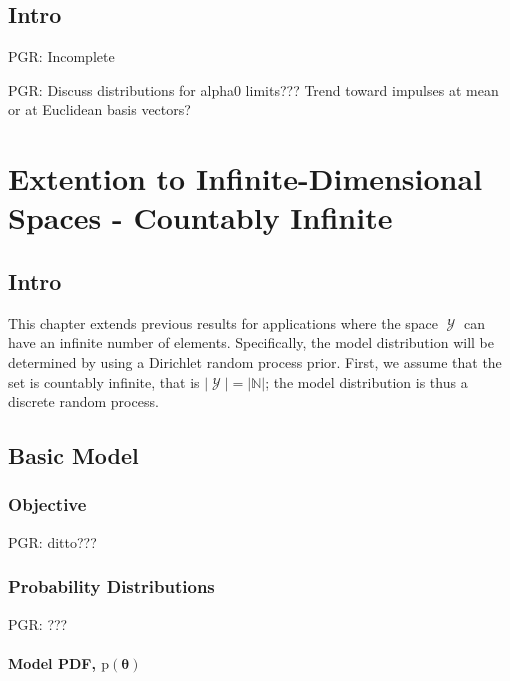 \documentclass[12pt]{report}
\DeclareMathOperator{\Ycal}{\mathcal{Y}}
\begin{document}
\section{Intro}

PGR: Incomplete

PGR: Discuss distributions for alpha0 limits??? Trend toward impulses at mean or at Euclidean basis vectors?















\chapter{Extention to Infinite-Dimensional Spaces - Countably Infinite}


\section{Intro}

This chapter extends previous results for applications where the space $\Ycal$ can have an infinite number of elements. Specifically, the model distribution will be determined by using a Dirichlet random process prior. First, we assume that the set is countably infinite, that is $|\Ycal| = |\mathbb{N}|$; the model distribution is thus a discrete random process. 




\section{Basic Model}


\subsection{Objective}

PGR: ditto???


\subsection{Probability Distributions}

PGR: ???


\subsubsection{Model PDF, $\text{p}(\bm{\theta})$}
\end{document}
